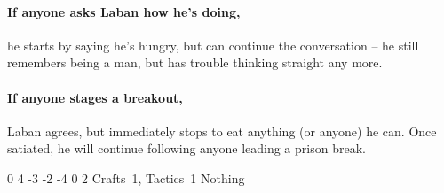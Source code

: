\paragraph{If anyone asks Laban how he's doing,}
he starts by saying he's hungry, but can continue the conversation -- he still remembers being a man, but has trouble thinking straight any more.

\paragraph{If anyone stages a breakout,}
Laban agrees, but immediately stops to eat anything (or anyone) he can.
Once satiated, he will continue following anyone leading a prison break.


  {0}%
  {4}%
  {{-3}%
  {-2}%
  {-4}}%
  {0}%
  {2}%
  {Crafts~1, Tactics~1}%
  {Nothing}%
  {}

